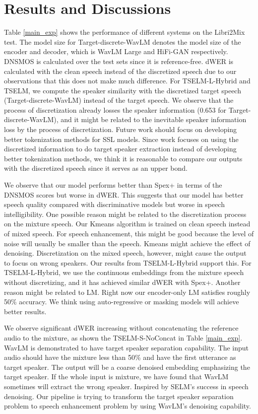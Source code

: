 \documentclass[conference]{IEEEtran}
\begin{document}
\section{Results and Discussions}
Table \ref{main_exp} shows the performance of different systems on the Libri2Mix test.
The model size for Target-discrete-WavLM denotes the model size of the encoder and 
decoder, which is WavLM Large and HiFi-GAN respectively. DNSMOS is calculated over the 
test sets since it is reference-free. dWER is calculated with the clean speech instead 
of the discretized speech due to our observations that this does not make much difference. 
For TSELM-L-Hybrid and TSELM, we compute the speaker similarity with the discretized
target speech (Target-discrete-WavLM) instead of the target speech.
We observe that the process of discretization already losses the speaker
information (0.653 for Target-discrete-WavLM), and it might be related to the inevitable speaker 
information loss by the process of discretization. Future work should focus on developing better 
tokenization methods for SSL models. 
Since work focuses on using the discretized information 
to do target speaker extraction instead of developing better tokenization methods, we think it is 
reasonable to compare our outputs with the discretized speech since it serves as an upper bond.   

We observe that our model performs better than Spex+ in terms of the DNSMOS scores but worse in dWER. 
This suggests that our model has better speech quality compared with discriminative models but 
worse in speech intelligibility. One possible reason might be related 
to the discretization process on the mixture 
speech. Our Kmeans algorithm is trained on clean speech instead of mixed speech. 
For speech enhancement, this might be 
good because the level of noise will usually be smaller than the speech. Kmeans might achieve the 
effect of denoising. Discretization on the mixed
speech, however, might cause the output to focus on wrong speakers. 
Our results from TSELM-L-Hybrid 
support 
this. For TSELM-L-Hybrid, we use the continuous embeddings from the mixture speech without discretizing, and it has 
achieved similar dWER with Spex+. Another reason might be related to LM. Right now our encoder-only 
LM satisfies roughly 50\% accuracy. We think using auto-regressive or masking models will achieve 
better results. 

We observe significant dWER increasing without concatenating the reference audio to the mixture, 
as shown 
the TSELM-S-NoConcat in Table \ref{main_exp}. WavLM \cite{wavlm} is demonstrated to have target speaker 
separation capability. The input audio should have the mixture less than 50\% and have the first utterance as target speaker. The output will be a coarse denoised embedding emphasizing the target speaker. 
If the whole input is mixture, we have found that WavLM sometimes will 
extract the wrong speaker. Inspired by SELM's \cite{selm} success in speech denoising. Our pipeline is trying to transform
the target speaker separation problem to speech enhancement problem by using WavLM's denoising capability.
\end{document}
